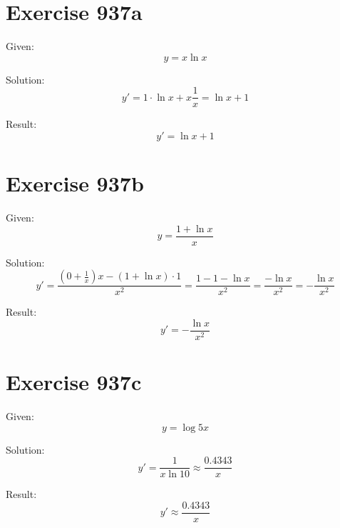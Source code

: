 \documentclass[a4paper, 10pt]{scrartcl}
\begin{document}
\section{Exercise 937a}

Given:
\[
y = x\ln{x}
\]

Solution:
\[
y' = 1\cdot\ln{x} + x\frac{1}{x} = \ln{x} + 1
\]

Result:
\[
y' = \ln{x} + 1
\]

\section{Exercise 937b}

Given:
\[
y = \frac{1 + \ln{x}}{x}
\]

Solution:
\[
y' = \frac{(0 + \frac{1}{x})x - (1 + \ln{x})\cdot1}{x^{2}} = \frac{1 - 1 - \ln{x}}{x^{2}} = \frac{-\ln{x}}{x^{2}} = -\frac{\ln{x}}{x^{2}}
\]

Result:
\[
y' = -\frac{\ln{x}}{x^{2}}
\]

\section{Exercise 937c}

Given:
\[
y = \log{5x}
\]

Solution:
\[
y' = \frac{1}{x\ln{10}} \approx \frac{0.4343}{x}
\]

Result:
\[
y' \approx \frac{0.4343}{x}
\]
\end{document}
